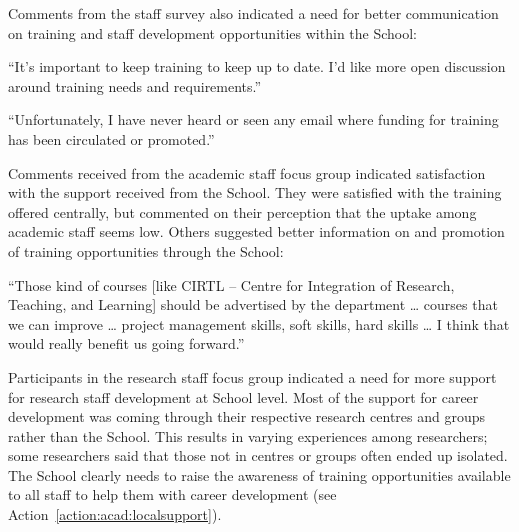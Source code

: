 Comments from the staff survey also indicated a need for better communication on training and staff development opportunities within the School:

\begin{myquote}
``It's important to keep training to keep up to date. I'd like more open discussion around training needs and requirements.''
\end{myquote}

\begin{myquote}
“Unfortunately, I have never heard or seen any email where funding for training has been circulated or promoted.''
\end{myquote}

Comments received from the academic staff focus group indicated satisfaction  %
with the support received from the School. They were satisfied with the training offered centrally, but commented on their perception that the uptake among academic staff seems low. Others suggested better information on and promotion of training opportunities through the School:

\begin{myquote}
``Those kind of courses [like CIRTL – Centre for Integration of Research, Teaching, and Learning] should be advertised by the department … courses that we can improve … project management skills, soft skills, hard skills … I think that would really benefit us going forward.''
\end{myquote}

Participants in the research staff focus group indicated a need for more support for research staff development at School level. 
Most of the support for career development was coming through their respective research centres and groups rather than the School. 
This results in varying experiences among researchers; some researchers said that those not in centres or groups often ended up isolated. The School clearly needs to raise the awareness of training opportunities available to all staff to help them with career development (see %
Action~\ref{action:acad:localsupport}).



